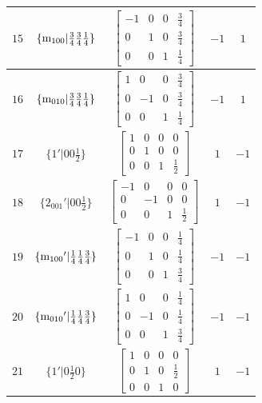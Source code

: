 \documentclass[fleqn,8pt]{jsarticle}
\begin{document}
\begin{longtable}{ccccc}
$ 15 $ & $ \{{\rm m}_{100}|\frac{3}{4} \frac{3}{4} \frac{1}{4}\} $ & $ \begin{bmatrix} -1 & 0 & 0 & \frac{3}{4} \\ 0 & 1 & 0 & \frac{3}{4} \\ 0 & 0 & 1 & \frac{1}{4} \end{bmatrix} $ & $ -1 $ & $ 1 $ \\ \hline
$ 16 $ & $ \{{\rm m}_{010}|\frac{3}{4} \frac{3}{4} \frac{1}{4}\} $ & $ \begin{bmatrix} 1 & 0 & 0 & \frac{3}{4} \\ 0 & -1 & 0 & \frac{3}{4} \\ 0 & 0 & 1 & \frac{1}{4} \end{bmatrix} $ & $ -1 $ & $ 1 $ \\ \hline
$ 17 $ & $ \{1{}'|0 0 \frac{1}{2}\} $ & $ \begin{bmatrix} 1 & 0 & 0 & 0 \\ 0 & 1 & 0 & 0 \\ 0 & 0 & 1 & \frac{1}{2} \end{bmatrix} $ & $ 1 $ & $ -1 $ \\ \hline
$ 18 $ & $ \{2{}_{001}{}'|0 0 \frac{1}{2}\} $ & $ \begin{bmatrix} -1 & 0 & 0 & 0 \\ 0 & -1 & 0 & 0 \\ 0 & 0 & 1 & \frac{1}{2} \end{bmatrix} $ & $ 1 $ & $ -1 $ \\ \hline
$ 19 $ & $ \{{\rm m}_{100}{}'|\frac{1}{4} \frac{1}{4} \frac{3}{4}\} $ & $ \begin{bmatrix} -1 & 0 & 0 & \frac{1}{4} \\ 0 & 1 & 0 & \frac{1}{4} \\ 0 & 0 & 1 & \frac{3}{4} \end{bmatrix} $ & $ -1 $ & $ -1 $ \\ \hline
$ 20 $ & $ \{{\rm m}_{010}{}'|\frac{1}{4} \frac{1}{4} \frac{3}{4}\} $ & $ \begin{bmatrix} 1 & 0 & 0 & \frac{1}{4} \\ 0 & -1 & 0 & \frac{1}{4} \\ 0 & 0 & 1 & \frac{3}{4} \end{bmatrix} $ & $ -1 $ & $ -1 $ \\ \hline
$ 21 $ & $ \{1{}'|0 \frac{1}{2} 0\} $ & $ \begin{bmatrix} 1 & 0 & 0 & 0 \\ 0 & 1 & 0 & \frac{1}{2} \\ 0 & 0 & 1 & 0 \end{bmatrix} $ & $ 1 $ & $ -1 $ \\ \hline

\end{longtable}
\end{document}
